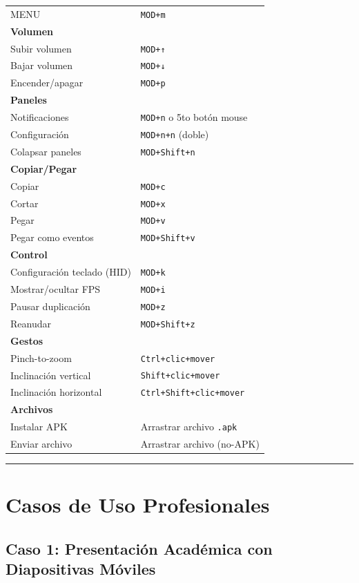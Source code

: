 \documentclass[
  doc,
  floatsintext,
  longtable,
  a4paper,
  nolmodern,
  notxfonts,
  notimes,
  12pt,
  colorlinks=true,linkcolor=blue,citecolor=blue,urlcolor=blue]{apa7}
\begin{document}
{\begin{longtable}[]{@{}ll@{}}
MENU & \texttt{MOD+m} \\
\textbf{Volumen} & \\
Subir volumen & \texttt{MOD+↑} \\
Bajar volumen & \texttt{MOD+↓} \\
Encender/apagar & \texttt{MOD+p} \\
\textbf{Paneles} & \\
Notificaciones & \texttt{MOD+n} o 5to botón mouse \\
Configuración & \texttt{MOD+n+n} (doble) \\
Colapsar paneles & \texttt{MOD+Shift+n} \\
\textbf{Copiar/Pegar} & \\
Copiar & \texttt{MOD+c} \\
Cortar & \texttt{MOD+x} \\
Pegar & \texttt{MOD+v} \\
Pegar como eventos & \texttt{MOD+Shift+v} \\
\textbf{Control} & \\
Configuración teclado (HID) & \texttt{MOD+k} \\
Mostrar/ocultar FPS & \texttt{MOD+i} \\
Pausar duplicación & \texttt{MOD+z} \\
Reanudar & \texttt{MOD+Shift+z} \\
\textbf{Gestos} & \\
Pinch-to-zoom & \texttt{Ctrl+clic+mover} \\
Inclinación vertical & \texttt{Shift+clic+mover} \\
Inclinación horizontal & \texttt{Ctrl+Shift+clic+mover} \\
\textbf{Archivos} & \\
Instalar APK & Arrastrar archivo \texttt{.apk} \\
Enviar archivo & Arrastrar archivo (no-APK) \\
\end{longtable}
}

\begin{center}\rule{0.5\linewidth}{0.5pt}\end{center}

\section{Casos de Uso Profesionales}\label{casos-de-uso-profesionales}

\subsection{Caso 1: Presentación Académica con Diapositivas
Móviles}\label{caso-1-presentaciuxf3n-acaduxe9mica-con-diapositivas-muxf3viles}
\end{document}

